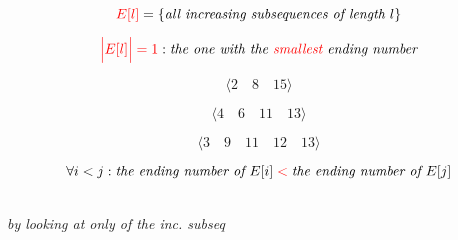\begin{frame}{}
  \[
    \textcolor{red}{E[l]} = \left\{\text{\it all increasing subsequences of length $l$}\right\}
  \]

  \[
    \textcolor{red}{\Big|E[l]\Big| = 1}: \text{\it the one with the \textcolor{red}{\it smallest} ending number}
  \]

  \pause
  \[
    \langle 2\quad 8\quad 15 \rangle
  \]
  
  \[
    \langle 4\quad 6\quad 11\quad 13 \rangle
  \]

  \[
    \langle 3\quad 9\quad 11\quad 12\quad 13 \rangle
  \]

  \pause
  \[
    \forall i < j: \text{\it the ending number of } E[i] \;\textcolor{red}{<}\; \text{\it the ending number of } E[j]
  \]
\end{frame}

\begin{frame}{}
  
\end{frame}

\begin{frame}{}
  \begin{center}
    {\Large \it {}} \\[6pt] \pause
    {\large \it by looking at only  of the inc. subseq}
  \end{center}

  \pause
  
\end{frame}

%   

\begin{frame}{}

\end{frame}


